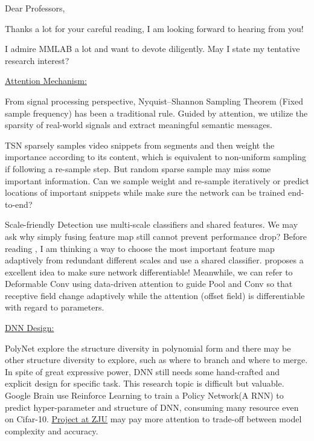 \documentclass[11pt,a4paper,colorlinks,linkcolor=brown]{moderncv}        %
\begin{document}
	\date{\today}
	\opening{Dear Professors,}
	\closing{Thanks a lot for your careful reading, I am looking forward to hearing from you!}
	\makelettertitle
	I admire MMLAB a lot and want to devote diligently.  May I state my tentative research interest?
	
	\underline{Attention Mechanism:}
	
	From signal processing perspective, Nyquist–Shannon Sampling Theorem (Fixed sample frequency) has been a traditional rule. Guided by attention, we utilize the sparsity of real-world signals and extract meaningful semantic messages. 
	
	TSN \cite{tsn} sparsely samples video snippets from segments and then weight the importance according to its content, which is equivalent to non-uniform sampling if following a re-sample step. But random sparse sample may miss some important information.  Can we sample weight and re-sample iteratively or predict locations of important snippets while make sure the network can be trained end-to-end? 
	
	Scale-friendly Detection \cite{scale} use multi-scale classifiers and shared features.  We may ask why simply fusing feature map still cannot prevent performance drop?  Before reading \cite{scale}, I am thinking a way to choose the most important feature map adaptively from redundant different scales and use a shared classifier. \cite{scale} proposes a excellent idea to make sure network differentiable! Meanwhile, we can refer to Deformable Conv \cite{deform}  using data-driven attention to guide Pool and Conv  so that receptive field change adaptively while the attention (offset field) is differentiable with regard to parameters. 
		
	\underline{DNN Design:} \hypersetup{urlcolor=brown}
	
	PolyNet \cite{poly} explore the structure diversity in polynomial form and there may be other structure diversity to explore, such as where to branch and where to merge. In spite of great expressive power, DNN still needs some hand-crafted and explicit design for specific task. This research topic is difficult but valuable. Google Brain \cite{rl} use Reinforce Learning to train a Policy Network(A RNN) to predict hyper-parameter and structure of DNN, consuming many resource even on Cifar-10. \href{https://github.com/luzai/NetworkCompress}{Project at ZJU} may pay more attention to trade-off between model complexity and accuracy. 
	
\end{document}
